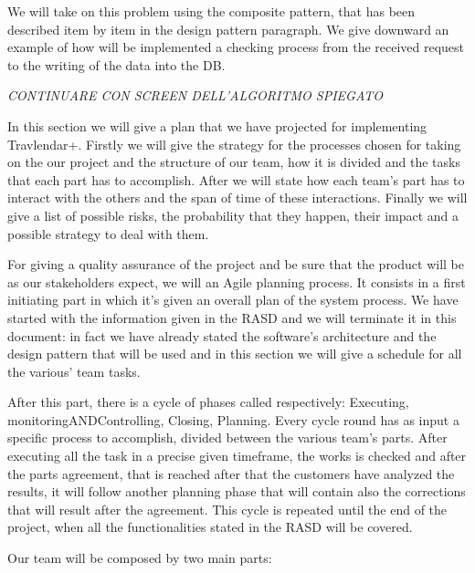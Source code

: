 We will take on this problem using the composite pattern, that has been described item by item in the design pattern paragraph. We give downward an example of how will be implemented a checking process from the received request to the writing of the data into the DB.

\emph{ \huge CONTINUARE CON SCREEN DELL'ALGORITMO SPIEGATO}

In this section we will give a plan that we have projected for implementing Travlendar+. 
Firstly we will give the strategy for the processes chosen for taking on the our project and the structure of our team, how it is divided and the tasks that each part has to accomplish.
After we will state how each team’s part has to interact with the others and the span of time of these interactions. 
Finally we will give a list of possible risks, the probability that they happen, their impact and a possible strategy to deal with them.

For giving a quality assurance of the project and be sure that the product will be as our stakeholders expect, we will an Agile planning process. It consists in a first initiating part in which it’s given an overall plan of the system process. 
We have started with the information given in the RASD and we will terminate it in this document: in fact we have already stated the software’s architecture and the design pattern that will be used and in this section we will give a schedule for all the various' team tasks.

After this part, there is a cycle of phases called respectively: Executing, monitoringANDControlling, Closing, Planning. 
Every cycle round has as input a specific process to accomplish, divided between the various team’s parts. After executing all the task in a precise given timeframe, the works is checked and after the parts agreement, that is reached after that the customers have analyzed the results, it will follow another planning phase that will contain also the corrections that will result after the agreement.
This cycle is repeated until the end of the project, when all the functionalities stated in the RASD will be covered.

Our team will be composed by two main parts:

